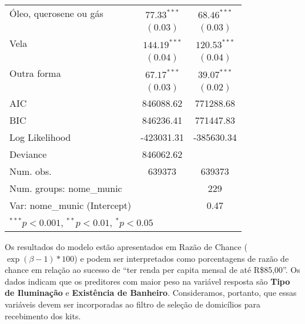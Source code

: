\documentclass[a4paper, 12pt, openright, oneside, english, brazil, article]{abntex2}
\begin{document}
\begin{table}[!h]
{\begin{tabular}{l c c}
				Óleo, querosene ou gás           & $77.33^{***}$  & $68.46^{***}$  \\
				& $(0.03)$      & $(0.03)$      \\
				Vela                             & $144.19^{***}$  & $120.53^{***}$  \\
				& $(0.04)$      & $(0.04)$      \\
				Outra forma                      & $67.17^{***}$  & $39.07^{***}$  \\
				& $(0.03)$      & $(0.02)$      \\
				\hline
				AIC                                                         & 846088.62     & 771288.68     \\
				BIC                                                         & 846236.41     & 771447.83     \\
				Log Likelihood                                              & -423031.31    & -385630.34    \\
				Deviance                                                    & 846062.62     &               \\
				Num. obs.                                                   & 639373        & 639373        \\
				Num. groups: nome\_munic                                    &               & 229           \\
				Var: nome\_munic (Intercept)                                &               & 0.47          \\
				\hline
				\multicolumn{3}{l}{\scriptsize{$^{***}p<0.001$, $^{**}p<0.01$, $^*p<0.05$}}
			\end{tabular}
			}
			{}
		\end{table}
	

		Os resultados do modelo estão apresentados em Razão de Chance ($\exp(\beta - 1) * 100$) e podem ser interpretados como porcentagens de razão de chance em relação ao sucesso de ``ter renda per capita mensal de até R\$85,00''. Os dados indicam que os preditores com maior peso na variável resposta são \textbf{Tipo de Iluminação} e \textbf{Existência de Banheiro}. Consideramos, portanto, que essas variáveis devem ser incorporadas ao filtro de seleção de domicílios para recebimento dos kits.
	
	
\end{document}
